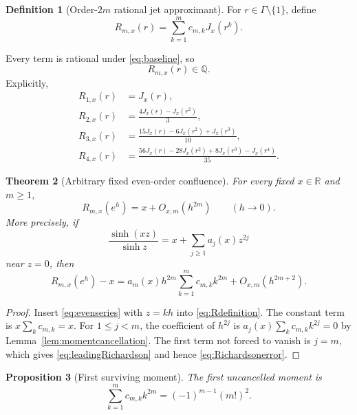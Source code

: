 \documentclass[11pt,oneside]{article}
\newtheorem{theorem}{Theorem}[section]
\newtheorem{proposition}[theorem]{Proposition}
\theoremstyle{definition}
\newtheorem{definition}[theorem]{Definition}
\theoremstyle{remark}
\newcommand{\Q}{\mathbb Q}
\newcommand{\R}{\mathbb R}
\begin{document}
\begin{definition}[Order-$2m$ rational jet approximant]
For $r\in\Gamma\setminus\{1\}$, define
\begin{equation}
 R_{m,x}(r)=\sum_{k=1}^m c_{m,k}J_x(r^k).
 \label{eq:Rdefinition}
\end{equation}
\end{definition}

Every term is rational under \eqref{eq:baseline}, so
\begin{equation}
 R_{m,x}(r)\in\Q.
 \label{eq:Rrational}
\end{equation}
Explicitly,
\begin{align}
 R_{1,x}(r)&=J_x(r),
 \label{eq:R1}\\
 R_{2,x}(r)&=\frac{4J_x(r)-J_x(r^2)}3,
 \label{eq:R2}\\
 R_{3,x}(r)&=\frac{15J_x(r)-6J_x(r^2)+J_x(r^3)}{10},
 \label{eq:R3}\\
 R_{4,x}(r)&=\frac{56J_x(r)-28J_x(r^2)+8J_x(r^3)-J_x(r^4)}{35}.
 \label{eq:R4}
\end{align}

\begin{theorem}[Arbitrary fixed even-order confluence]
\label{thm:richardsonorder}
For every fixed $x\in\R$ and $m\ge1$,
\begin{equation}
 R_{m,x}(e^h)=x+O_{x,m}(h^{2m})
 \qquad(h\to0).
 \label{eq:Richardsonerror}
\end{equation}
More precisely, if
\begin{equation}
 \frac{\sinh(xz)}{\sinh z}=x+\sum_{j\ge1}a_j(x)z^{2j}
 \label{eq:evenseries}
\end{equation}
near $z=0$, then
\begin{equation}
 R_{m,x}(e^h)-x
 =a_m(x)h^{2m}\sum_{k=1}^m c_{m,k}k^{2m}+O_{x,m}(h^{2m+2}).
 \label{eq:leadingRichardson}
\end{equation}
\end{theorem}

\begin{proof}
Insert \eqref{eq:evenseries} with $z=kh$ into \eqref{eq:Rdefinition}.  The constant term is
$x\sum_kc_{m,k}=x$.  For $1\le j<m$, the coefficient of $h^{2j}$ is
$a_j(x)\sum_kc_{m,k}k^{2j}=0$ by Lemma~\ref{lem:momentcancellation}.  The first term not
forced to vanish is $j=m$, which gives \eqref{eq:leadingRichardson} and hence
\eqref{eq:Richardsonerror}.
\end{proof}

\begin{proposition}[First surviving moment]
\label{prop:firstsurvivingmoment}
The first uncancelled moment is
\begin{equation}
 \sum_{k=1}^m c_{m,k}k^{2m}=(-1)^{m-1}(m!)^2.
 \label{eq:firstsurvivingmoment}
\end{equation}
\end{proposition}
\end{document}
